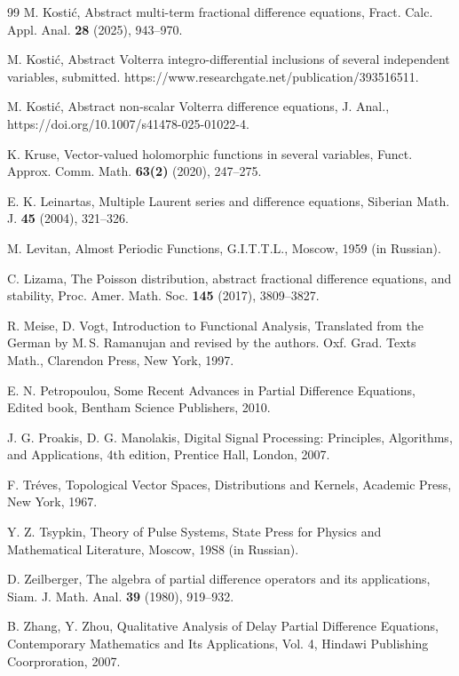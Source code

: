 \documentclass{amsart}
\theoremstyle{definition}
\theoremstyle{remark}
\numberwithin{equation}{section}
\begin{document}
\begin{thebibliography}{99}
M. Kosti\'c,
Abstract multi-term fractional difference equations,
Fract. Calc. Appl. Anal. {\bf 28} (2025), 943--970.

M. Kosti\'c,
Abstract Volterra integro-differential inclusions of several independent variables,
submitted. https://www.researchgate.net/publication/393516511.

M. Kosti\'c,
Abstract non-scalar Volterra difference equations,
J. Anal.,
https://doi.org/10.1007/s41478-025-01022-4.

K. Kruse,
Vector-valued holomorphic functions in several variables,
Funct. Approx. Comm.
Math. {\bf 63(2)} (2020), 247--275.

E. K. Leinartas,
Multiple Laurent series and difference equations,
Siberian Math. J. {\bf 45} (2004), 321--326.

M. Levitan,
Almost Periodic Functions,
G.I.T.T.L., Moscow, 1959 (in Russian).

C. Lizama,
The Poisson distribution, abstract fractional difference equations, and stability,
Proc. Amer. Math. Soc. {\bf 145} (2017), 3809--3827.

R. Meise, D. Vogt,
Introduction to Functional Analysis,
Translated from the German by M.\,S. Ramanujan and revised by the authors.
Oxf. Grad. Texts Math., Clarendon Press, New York, 1997.

E. N. Petropoulou,
Some Recent Advances in Partial Difference Equations,
Edited book, Bentham Science Publishers, 2010.

J. G. Proakis, D. G. Manolakis,
Digital Signal Processing:
Principles, Algorithms, and Applications, 
4th edition, Prentice Hall, London, 2007.

F. Tr\'eves,
Topological Vector Spaces, Distributions and Kernels,
Academic Press, New York, 1967.

Y. Z. Tsypkin,
Theory of Pulse Systems,
 State Press for Physics and Mathematical
Literature, Moscow, 19S8 (in Russian).

D. Zeilberger, 
The algebra of partial difference operators and its applications, 
Siam. J. Math. Anal. {\bf 39} (1980), 919--932.

B. Zhang, Y. Zhou,
Qualitative Analysis of Delay
Partial Difference Equations,
Contemporary Mathematics and Its Applications, Vol. 4,
Hindawi Publishing Coorproration, 2007. 

\end{thebibliography}
\end{document}
